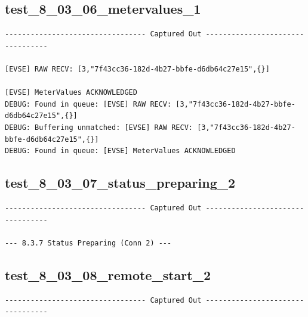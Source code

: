 \documentclass{article}
\begin{document}
\subsection*{test\_8\_03\_06\_metervalues\_1}
\begin{lstlisting}
--------------------------------- Captured Out ---------------------------------

[EVSE] RAW RECV: [3,"7f43cc36-182d-4b27-bbfe-d6db64c27e15",{}]

[EVSE] MeterValues ACKNOWLEDGED
DEBUG: Found in queue: [EVSE] RAW RECV: [3,"7f43cc36-182d-4b27-bbfe-d6db64c27e15",{}]
DEBUG: Buffering unmatched: [EVSE] RAW RECV: [3,"7f43cc36-182d-4b27-bbfe-d6db64c27e15",{}]
DEBUG: Found in queue: [EVSE] MeterValues ACKNOWLEDGED
\end{lstlisting}
\subsection*{test\_8\_03\_07\_status\_preparing\_2}
\begin{lstlisting}
--------------------------------- Captured Out ---------------------------------

--- 8.3.7 Status Preparing (Conn 2) ---
\end{lstlisting}
\subsection*{test\_8\_03\_08\_remote\_start\_2}
\begin{lstlisting}
--------------------------------- Captured Out ---------------------------------
\end{lstlisting}
\end{document}
